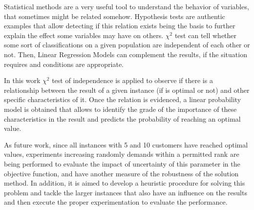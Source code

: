 \documentclass[5p,times]{elsarticle}
\begin{document}
	Statistical methods are a very useful tool to understand the behavior of variables, that sometimes might be related somehow. Hypothesis tests are authentic examples that allow detecting if this relation exists being the basis to further explain the effect some variables may have on others. $\chi^{2}$ test can tell whether some sort of classifications on a given population are independent of each other or not. Then, Linear Regression Models can complement the results, if the situation requires and conditions are appropriate.
	
	In this work $\chi^{2}$ test of independence is applied to observe if there is a relationship between the result of a given instance (if is optimal or not) and other specific characteristics of it. Once the relation is evidenced, a linear probability model is obtained that allows to identify the grade of the importance of these characteristics in the result and predicts the probability of reaching an optimal value.
	
	As future work, since all instances with 5 and 10 customers have reached optimal values, experiments increasing randomly demands within a permitted rank are being performed to evaluate the impact of uncertainty of this parameter in the objective function, and have another measure of the robustness of the solution method. In addition, it is aimed to develop a heuristic procedure for solving this problem and tackle the larger instances that also have an influence on the results and then execute the proper experimentation to evaluate the performance.

 


%

%





%

%


\end{document}
